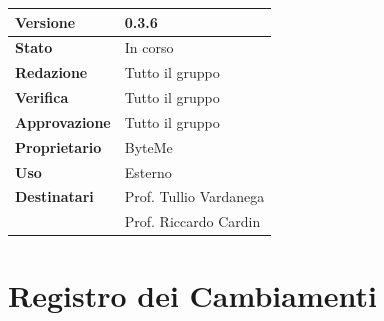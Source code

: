 \documentclass[11pt,a4paper]{article}
\begin{document}
\begin{titlepage}
    \begin{table}[H]
        \centering
        \begin{tabular}{|l|p{5cm}|}
            \hline
            \textbf{Versione} & 0.3.6 \\
            \hline
            \textbf{Stato} & In corso \\
            \hline
            \textbf{Redazione} & Tutto il gruppo \\
            \hline
            \textbf{Verifica} & Tutto il gruppo \\
            \hline
            \textbf{Approvazione} & Tutto il gruppo \\
            \hline
            \textbf{Proprietario} & ByteMe \\
            \hline
            \textbf{Uso} & Esterno \\
            \hline
            \textbf{Destinatari} & Prof. Tullio Vardanega \\ & Prof. Riccardo Cardin \\
            \hline
        \end{tabular}
    \end{table}
    
    \vfill
\end{titlepage}

\thispagestyle{empty}
\section*{Registro dei Cambiamenti}
\end{document}
